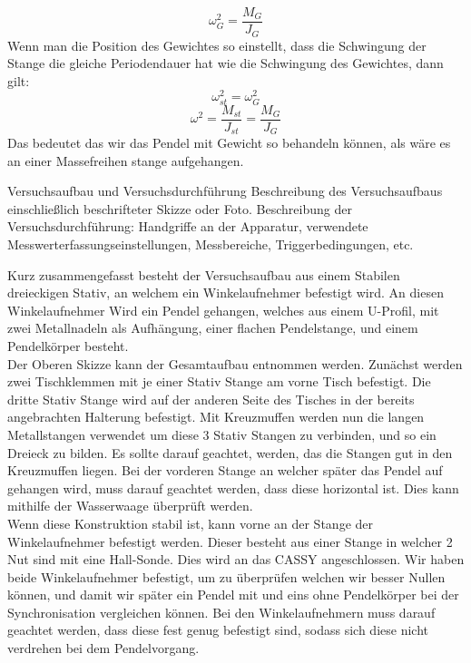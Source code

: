 \documentclass[twoside]{protokoll}
\begin{document}
\begin{equation}
    \omega_{G}^2 = \frac{M_G}{J_G}
\end{equation}
Wenn man die Position des Gewichtes so einstellt, dass die Schwingung der Stange die gleiche Periodendauer hat wie die Schwingung des Gewichtes, dann gilt:
\begin{equation}
    \omega_{st}^2 = \omega_{G}^2
\end{equation}
\begin{equation}
    \omega^2 = \frac{M_{st}}{J_{st}} = \frac{M_G}{J_G}
\end{equation}
Das bedeutet das wir das Pendel mit Gewicht so behandeln können, als wäre es an einer Massefreihen stange aufgehangen.





\begin{aufgabe}{Versuchsaufbau und Versuchsdurchführung}
  Beschreibung des Versuchsaufbaus einschließlich beschrifteter Skizze
  oder Foto. Beschreibung der Versuchsdurchführung: Handgriffe an der
  Apparatur, verwendete Messwerterfassungseinstellungen, Messbereiche,
  Triggerbedingungen, etc.
\end{aufgabe}

Kurz zusammengefasst besteht der Versuchsaufbau aus einem Stabilen dreieckigen Stativ, an welchem ein Winkelaufnehmer befestigt wird.
An diesen Winkelaufnehmer Wird ein Pendel gehangen, welches aus einem U-Profil, mit zwei Metallnadeln als Aufhängung, einer flachen Pendelstange, und einem Pendelkörper besteht.\\


Der Oberen Skizze kann der Gesamtaufbau entnommen werden. 
Zunächst werden zwei Tischklemmen mit je einer Stativ Stange am vorne Tisch befestigt.
Die dritte Stativ Stange wird auf der anderen Seite des Tisches in der bereits angebrachten Halterung befestigt. 
Mit Kreuzmuffen werden nun die langen Metallstangen verwendet um diese 3 Stativ Stangen zu verbinden, und so ein Dreieck zu bilden.
Es sollte darauf geachtet, werden, das die Stangen gut in den Kreuzmuffen liegen. 
Bei der vorderen Stange an welcher später das Pendel auf gehangen wird, muss darauf geachtet werden, dass diese horizontal ist.
Dies kann mithilfe der Wasserwaage überprüft werden.\\

Wenn diese Konstruktion stabil ist, kann vorne an der Stange der Winkelaufnehmer befestigt werden. 
Dieser besteht aus einer Stange in welcher 2 Nut sind mit eine Hall-Sonde. 
Dies wird an das CASSY angeschlossen.
Wir haben beide Winkelaufnehmer befestigt, um zu überprüfen welchen wir besser Nullen können, und damit wir später ein Pendel mit und eins ohne Pendelkörper bei der Synchronisation vergleichen können.
Bei den Winkelaufnehmern muss darauf geachtet werden, dass diese fest genug befestigt sind, sodass sich diese nicht verdrehen bei dem Pendelvorgang.\\
\end{document}

